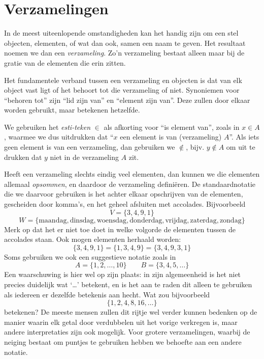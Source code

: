 \chapter{Verzamelingen}\label{ch:verzamelingen}
In de meest uiteenlopende omstandigheden kan het handig zijn om een stel objecten, elementen, of wat dan ook, samen een naam te geven. Het resultaat noemen we dan een \textit{verzameling}. Zo'n verzameling bestaat alleen maar bij de gratie van de elementen die erin zitten.

Het fundamentele verband tussen een verzameling en objecten is dat van elk object vast ligt of het behoort tot die verzameling of niet. Synoniemen voor ``behoren tot'' zijn ``lid zijn van'' en ``element zijn van''. Deze zullen door elkaar worden gebruikt, maar betekenen hetzelfde.

We gebruiken het \textit{esti-teken} $\in$ als afkorting voor ``is element van'', zoals in $x\in A$, waarmee we dus uitdrukken dat ``$x$ een element is van (verzameling) $A$''. Als iets geen element is van een verzameling, dan gebruiken we $\not\in$, bijv. $y\not\in A$ om uit te drukken dat $y$ niet in de verzameling $A$ zit.

Heeft een verzameling slechts eindig veel elementen, dan kunnen we die elementen allemaal \textit{opsommen}, en daardoor de verzameling defini\"eren. De standaardnotatie die we daarvoor gebruiken is het achter elkaar opschrijven van de elementen, gescheiden door komma's, en het geheel afsluiten met accolades. Bijvoorbeeld
$$V=\{3,4,9,1\}$$
$$W=\{\text{maandag},\text{dinsdag},\text{woensdag},\text{donderdag},\text{vrijdag},\text{zaterdag},\text{zondag}\}$$
Merk op dat het er niet toe doet in welke volgorde de elementen tussen de accolades staan. Ook mogen elementen herhaald worden:
$$\{3, 4,9,1\}=\{1,3,4,9\}=\{3,4,9,3,1\}$$
Soms gebruiken we ook een suggestieve notatie zoals in
$$A=\{1,2,\ldots,10\}\qquad B=\{3,4,5,\ldots\}$$
Een waarschuwing is hier wel op zijn plaats: in zijn algemeenheid is het niet precies duidelijk wat `\ldots' betekent, en is het aan te raden dit alleen te gebruiken als iedereen er dezelfde betekenis aan hecht. Wat zou bijvoorbeeld 
$$\{1,2,4,8,16,\ldots\}$$
betekenen? De meeste mensen zullen dit rijtje wel verder kunnen bedenken op de manier waarin elk getal door verdubbelen uit het vorige verkregen is, maar andere interpretaties zijn ook mogelijk. Voor grotere verzamelingen, waarbij de neiging bestaat om puntjes te gebruiken hebben we behoefte aan een andere notatie.

